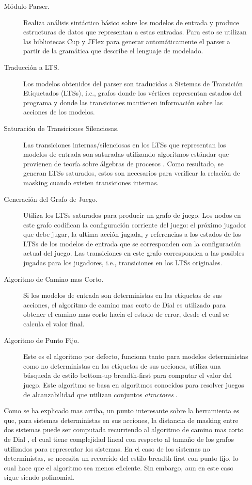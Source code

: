 \begin{description}
    \item[Módulo Parser.] Realiza análisis sintáctico básico sobre los modelos de entrada y produce estructuras de datos que representan a  estas entradas. Para esto se utilizan las bibliotecas \textsf{Cup} y 
    \textsf{JFlex} para generar automáticamente el parser a partir de la gramática que describe el lenguaje de modelado.
    \item[Traducción a LTS.] Los modelos obtenidos del parser son traducidos a Sistemas de Transición Etiquetados (LTSs), i.e., 
    grafos donde los vértices representan estados del programa y donde las transiciones mantienen información sobre las acciones de los modelos. 
    \item[Saturación de Transiciones Silenciosas.] Las transiciones internas/silenciosas en los LTSs que representan los modelos de entrada son saturadas utilizando algoritmos estándar que provienen de teoría sobre álgebras de procesos \cite{Milner89}. Como resultado, se generan LTSs saturados, estos son necesarios para verificar la relación de masking cuando existen transiciones internas.
    \item[Generación del Grafo de Juego.] Utiliza los LTSs saturados para producir un grafo de juego. Los nodos en este grafo codifican la configuración corriente del juego: 
    el próximo jugador que debe jugar, la ultima acción jugada, y referencias a los estados de los LTSs de los modelos de entrada que se corresponden con la configuración actual del juego. 
    Las transiciones en este grafo corresponden a las posibles jugadas para los jugadores, i.e.,  transiciones en los LTSs originales.
    \item[Algoritmo de Camino mas Corto.] Si los modelos de entrada son deterministas en las etiquetas de sus acciones, el algoritmo de camino mas corto de Dial es utilizado para obtener el camino mas corto hacia el estado de error, desde el cual se calcula el valor final.
    \item[Algoritmo de Punto Fijo.] Este es el algoritmo por defecto, funciona tanto para modelos deterministas como no deterministas en las etiquetas de sus acciones, utiliza una búsqueda de estilo bottom-up breadth-first para computar el valor del juego. 
    Este algoritmo se basa en algoritmos conocidos para resolver juegos de alcanzabilidad que utilizan conjuntos \emph{atractores} \cite{Jurd11}. 
\end{description}
Como se ha explicado mas arriba, un punto interesante sobre la herramienta es que, para sistemas deterministas en sus acciones, la distancia de masking entre dos sistemas puede ser computada recurriendo al algoritmo de camino mas corto de Dial \cite{Dial69}, el cual tiene complejidad lineal con respecto al tamaño de los grafos utilizados para representar los sistemas.
En el caso de los sistemas no deterministas, se necesita un recorrido del estilo 
breadth-first con punto fijo, lo cual hace que el algoritmo sea menos eficiente. Sin embargo, aun en este caso sigue siendo polinomial. 

